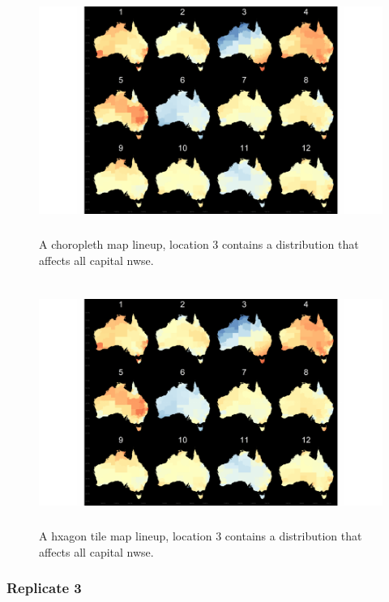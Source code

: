 \documentclass{monashthesis}
\begin{document}
\begin{figure}[H]
\centering
\includegraphics[height=8cm]{lineups/nwse-geo3-1.pdf}
\caption{\label{fig:nwse-geo3}A choropleth map lineup, location 3 contains a distribution that affects all capital nwse.}
\end{figure}

\begin{figure}[H]
\centering
\includegraphics[height=8cm]{lineups/nwse-hex3-1.pdf}
\caption{\label{fig:nwse-hex3}A hxagon tile map lineup, location 3 contains a distribution that affects all capital nwse.}
\end{figure}

\hypertarget{replicate-3-2}{%
\subsubsection{Replicate 3}\label{replicate-3-2}}
\end{document}
